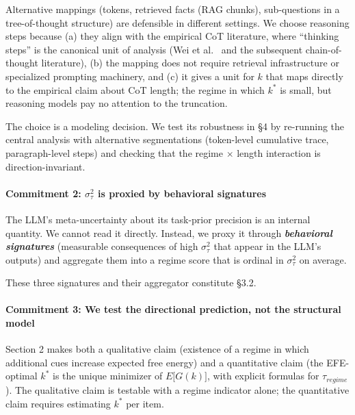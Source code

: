 \documentclass{article}
\begin{document}
Alternative mappings (tokens, retrieved facts (RAG chunks),
sub-questions in a tree-of-thought structure) are defensible in
different settings. We choose reasoning steps because (a) they align
with the empirical CoT literature, where ``thinking steps'' is the
canonical unit of analysis (Wei et al.~\cite{wei2022} and the subsequent
chain-of-thought literature), (b) the mapping does not require retrieval
infrastructure or specialized prompting machinery, and (c) it gives a
unit for \(k\) that maps directly to the empirical claim about CoT
length; the regime in which \(k^{*}\) is small, but reasoning models pay
no attention to the truncation.

The choice is a modeling decision. We test its robustness in \S{}4 by
re-running the central analysis with alternative segmentations
(token-level cumulative trace, paragraph-level steps) and checking that
the regime \(\times\) length interaction is direction-invariant.

\paragraph{\texorpdfstring{Commitment 2: \(\sigma_{\tau}^{2}\) is
proxied by behavioral
signatures}{Commitment 2: \textbackslash sigma\_\{\textbackslash tau\}\^{}\{2\} is proxied by behavioral signatures}}\label{commitment-2-sigma_tau2-is-proxied-by-behavioral-signatures}

The LLM's meta-uncertainty about its task-prior precision is an internal
quantity. We cannot read it directly. Instead, we proxy it through
\textbf{\emph{behavioral signatures}} (measurable consequences of high
\(\sigma_{\tau}^{2}\) that appear in the LLM's outputs) and aggregate
them into a regime score that is ordinal in \(\sigma_{\tau}^{2}\) on
average.

These three signatures and their aggregator constitute \S{}3.2.

\paragraph{Commitment 3: We test the directional prediction, not the
structural
model}\label{commitment-3-we-test-the-directional-prediction-not-the-structural-model}

Section 2 makes both a qualitative claim (existence of a regime in which
additional cues increase expected free energy) and a quantitative claim
(the EFE-optimal \(k^{*}\) is the unique minimizer of
\(E\lbrack G(k)\rbrack\), with explicit formulas for \(\tau_{regime}\)).
The qualitative claim is testable with a regime indicator alone; the
quantitative claim requires estimating \(k^{*}\) per item.
\end{document}
